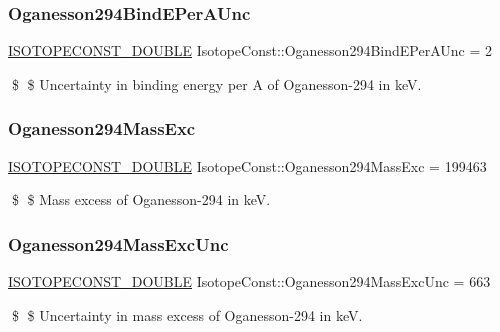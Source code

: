 \subsubsection{\texorpdfstring{Oganesson294\+Bind\+E\+Per\+A\+Unc}{Oganesson294BindEPerAUnc}}
{\footnotesize\ttfamily \mbox{\hyperlink{group___isotope_const-_macros_ga8f45a7272ce02c0b4c65c44636ed719a}{I\+S\+O\+T\+O\+P\+E\+C\+O\+N\+S\+T\+\_\+\+D\+O\+U\+B\+LE}} Isotope\+Const\+::\+Oganesson294\+Bind\+E\+Per\+A\+Unc = 2}

\$ \$ Uncertainty in binding energy per A of Oganesson-\/294 in keV. \mbox{\label{group___isotope_const-_oganesson-_og294_ga74989bd4a2119ca484c48826eab0c764}} 
\subsubsection{\texorpdfstring{Oganesson294\+Mass\+Exc}{Oganesson294MassExc}}
{\footnotesize\ttfamily \mbox{\hyperlink{group___isotope_const-_macros_ga8f45a7272ce02c0b4c65c44636ed719a}{I\+S\+O\+T\+O\+P\+E\+C\+O\+N\+S\+T\+\_\+\+D\+O\+U\+B\+LE}} Isotope\+Const\+::\+Oganesson294\+Mass\+Exc = 199463}

\$ \$ Mass excess of Oganesson-\/294 in keV. \mbox{\label{group___isotope_const-_oganesson-_og294_ga971c6846f671c1c77ce85b0342ffb40e}} 
\subsubsection{\texorpdfstring{Oganesson294\+Mass\+Exc\+Unc}{Oganesson294MassExcUnc}}
{\footnotesize\ttfamily \mbox{\hyperlink{group___isotope_const-_macros_ga8f45a7272ce02c0b4c65c44636ed719a}{I\+S\+O\+T\+O\+P\+E\+C\+O\+N\+S\+T\+\_\+\+D\+O\+U\+B\+LE}} Isotope\+Const\+::\+Oganesson294\+Mass\+Exc\+Unc = 663}

\$ \$ Uncertainty in mass excess of Oganesson-\/294 in keV. \mbox{\label{group___isotope_const-_oganesson-_og294_ga996d406bd754bc387189003204853ed7}} 
